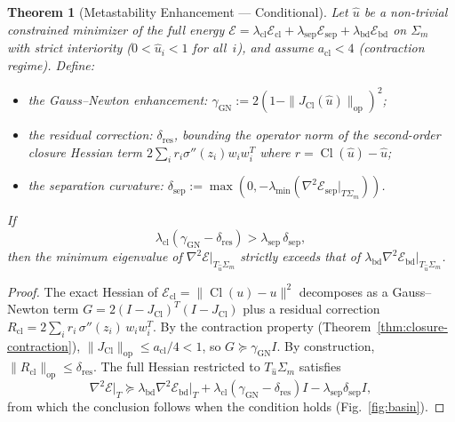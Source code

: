 \documentclass[lettersize,journal]{IEEEtran}
\newtheorem{theorem}{Theorem}
\DeclareMathOperator{\Cl}{Cl}
\begin{document}
\begin{theorem}[Metastability Enhancement --- Conditional]
\label{thm:metastability}
Let $\hat{u}$ be a non-trivial constrained minimizer of the full energy $\mathcal{E} = \lambda_{\mathrm{cl}}\mathcal{E}_{\mathrm{cl}} + \lambda_{\mathrm{sep}}\mathcal{E}_{\mathrm{sep}} + \lambda_{\mathrm{bd}}\mathcal{E}_{\mathrm{bd}}$ on $\Sigma_m$ with strict interiority ($0 < \hat{u}_i < 1$ for all~$i$), and assume $a_{\mathrm{cl}} < 4$ (contraction regime). Define:
\begin{itemize}
\item the \emph{Gauss--Newton enhancement}: $\gamma_{\mathrm{GN}} := 2(1 - \|J_{\Cl}(\hat{u})\|_{\mathrm{op}})^2$;
\item the \emph{residual correction}: $\delta_{\mathrm{res}}$, bounding the operator norm of the second-order closure Hessian term $2\sum_i r_i \sigma''(z_i) w_i w_i^T$ where $r = \Cl(\hat{u}) - \hat{u}$;
\item the \emph{separation curvature}: $\delta_{\mathrm{sep}} := \max(0, -\lambda_{\min}(\nabla^2\mathcal{E}_{\mathrm{sep}}|_{T\Sigma_m}))$.
\end{itemize}
If
\begin{equation}
\lambda_{\mathrm{cl}}(\gamma_{\mathrm{GN}} - \delta_{\mathrm{res}}) > \lambda_{\mathrm{sep}}\,\delta_{\mathrm{sep}},
\end{equation}
then the minimum eigenvalue of $\nabla^2\mathcal{E}|_{T_{\hat{u}}\Sigma_m}$ strictly exceeds that of $\lambda_{\mathrm{bd}}\nabla^2\mathcal{E}_{\mathrm{bd}}|_{T_{\hat{u}}\Sigma_m}$.
\end{theorem}

\begin{proof}
The exact Hessian of $\mathcal{E}_{\mathrm{cl}} = \|\Cl(u) - u\|^2$ decomposes as a Gauss--Newton term $G = 2(I - J_{\Cl})^T(I - J_{\Cl})$ plus a residual correction $R_{\mathrm{cl}} = 2\sum_i r_i\,\sigma''(z_i)\,w_i w_i^T$. By the contraction property (Theorem~\ref{thm:closure-contraction}), $\|J_{\Cl}\|_{\mathrm{op}} \leq a_{\mathrm{cl}}/4 < 1$, so $G \succeq \gamma_{\mathrm{GN}} I$. By construction, $\|R_{\mathrm{cl}}\|_{\mathrm{op}} \leq \delta_{\mathrm{res}}$. The full Hessian restricted to $T_{\hat{u}}\Sigma_m$ satisfies
$$\nabla^2\mathcal{E}\big|_T \succeq \lambda_{\mathrm{bd}}\nabla^2\mathcal{E}_{\mathrm{bd}}\big|_T + \lambda_{\mathrm{cl}}(\gamma_{\mathrm{GN}} - \delta_{\mathrm{res}})I - \lambda_{\mathrm{sep}}\delta_{\mathrm{sep}}I,$$
from which the conclusion follows when the condition holds (Fig.~\ref{fig:basin}).
\end{proof}
\end{document}
